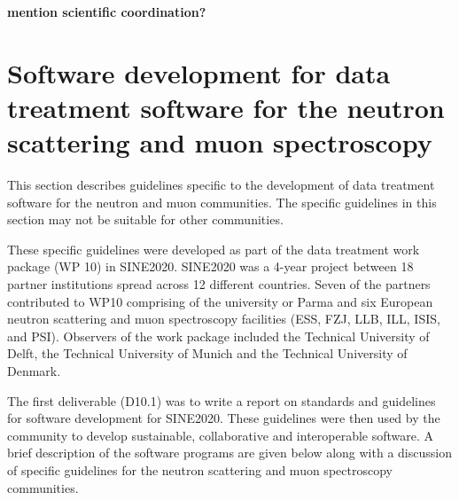 \documentclass[jnr]{iosart2x}
\newcommand{\todo}[1]{\textbf{#1}}
\begin{document}
\todo{mention scientific coordination?}

\section{Software development for data treatment software for the neutron scattering and muon spectroscopy}
\label{SINE2020}

This section describes guidelines specific to the development of data treatment software for the neutron and muon communities.
The specific guidelines in this section may not be suitable for other communities.

These specific guidelines were developed as part of the data treatment work package (WP 10) in SINE2020.
SINE2020 was a 4-year project between 18 partner institutions spread across 12 different countries.
Seven of the partners contributed to WP10 comprising of the university or Parma and six European neutron scattering and muon spectroscopy facilities (ESS, FZJ, LLB, ILL, ISIS, and PSI).
Observers of the work package included the Technical University of Delft, the Technical University of Munich and the Technical University of Denmark.

The first deliverable (D10.1) was to write a report on standards and guidelines for software development for SINE2020.
These guidelines were then used by the community to develop sustainable, collaborative and interoperable software.
A brief description of the software programs are given below along with a discussion of specific guidelines for the neutron scattering and muon spectroscopy communities.
\end{document}
